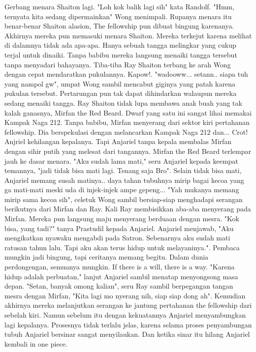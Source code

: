 \documentclass[a4paper,11pt,final]{article}
\begin{document}
Gerbang menara Shaiton lagi. "Loh kok balik lagi sih" kata Randolf. "Hmm, ternyata kita sedang dipermainkan" Wong menimpali. Rupanya menara itu benar-benar Shaiton alasion, The fellowship pun dibuat bingung karenanya.
Akhirnya mereka pun memasuki menara Shaiton. Mereka terkejut karena melihat di dalamnya tidak ada apa-apa. Hanya sebuah tangga melingkar yang cukup terjal untuk dinaiki. Tanpa babibu mereka langsung menaiki tangga tersebut tanpa menyadari bahayanya.
Tiba-tiba Ray Shaiton terbang ke arah Wong dengan cepat mendaratkan pukulannya. Kapow!.
"wadooww... setann.. siapa tuh yang nampol gw", umpat Wong sambil mencabut giginya yang patah karena pukulan tersebut.
Pertarungan pun tak dapat dihindarkan walaupun mereka sedang menaiki tangga. Ray Shaiton tidak lupa membawa anak buah yang tak kalah ganasnya, Mirfan the Red Beard. Dwarf yang satu ini sangat lihai memakai Kampak Naga 212.
Tanpa babibu, Mirfan menyerang dari sektor kiri pertahanan fellowship. Dia berspekulasi dengan melancarkan Kampak Naga 212 dan... Crot! Anjriel kehilangan kepalanya.
Tapi Anjariel tanpa kepala membalas Mirfan dengan sihir putih yang melesat dari tangannya. Mirfan the Red Beard terlempar jauh ke dasar menara. "Aku sudah lama mati," seru Anjariel kepada keempat temannya, "jadi tidak bisa mati lagi. Tenang saja Bro".
Selain tidak bisa mati, Anjariel memang susah matinya.. daya tahan tubuhnya mirip bagai kecoa yang ga mati-mati meski uda di injek-injek ampe gepeng...
"Yah mukanya memang mirip sama kecoa sih", celetuk Wong sambil bersiap-siap menghadapi serangan berikutnya dari Mirfan dan Ray. Kali Ray membisikkan aba-aba menyerang pada Mirfan. Mereka pun langsung maju menyerang berduaan dengan mesra.
"Kok bisa, yang tadi?" tanya Prastudil kepada Anjariel. Anjariel menjawab, "Aku mengikatkan nyawaku mengabdi pada Satron. Sebenarnya aku sudah mati ratusan tahun lalu. Tapi aku akan terus hidup untuk melayaninya.".
Pembaca mungkin jadi bingung, tapi ceritanya memang begitu. Dalam dunia perdongengan, semuanya mungkin. If there is a will, there is a way.
"Karena hidup adalah perbuatan," lanjut Anjariel sambil menatap menyongsong masa depan.
"Setan, banyak omong kalian", seru Ray sambil berpegangan tangan mesra dengan Mirfan, "Kita lagi mo nyerang nih, siap siap dong ah". Kemudian akhirnya mereka melanjutkan serangan ke jantung pertahanan the fellowship dari sebelah kiri.
Namun sebelum itu dengan kekuatannya Anjariel menyambungkan lagi kepalanya. Prosesnya tidak terlalu jelas, karena selama proses penyambungan tubuh Anjariel bersinar sangat menyilaukan. Dan ketika sinar itu hilang Anjariel kembali in one piece.
\end{document}
